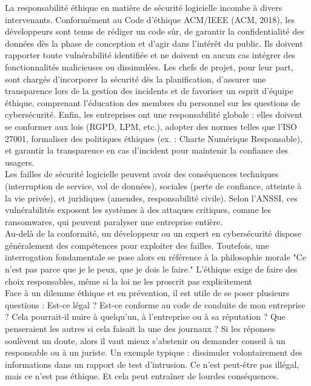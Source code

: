 \documentclass{article}
\begin{document}
La responsabilité éthique en matière de sécurité logicielle incombe à divers intervenants.
Conformément au Code d'éthique ACM/IEEE (ACM, 2018), les développeurs sont tenus de
rédiger un code sûr, de garantir la confidentialité des données dès la phase de conception et
d'agir dans l'intérêt du public. Ils doivent rapporter toute vulnérabilité identifiée et ne doivent
en aucun cas intégrer des fonctionnalités malicieuses ou dissimulées. Les chefs de projet, pour
leur part, sont chargés d’incorporer la sécurité dès la planification, d’assurer une transparence
lors de la gestion des incidents et de favoriser un esprit d'équipe éthique, comprenant
l'éducation des membres du personnel sur les questions de cybersécurité. Enfin, les entreprises
ont une responsabilité globale : elles doivent se conformer aux lois (RGPD, LPM, etc.), adopter
des normes telles que l’ISO 27001, formaliser des politiques éthiques (ex. : Charte Numérique
Responsable), et garantir la transparence en cas d’incident pour maintenir la confiance des
usagers.\\

Les failles de sécurité logicielle peuvent avoir des conséquences techniques (interruption
de service, vol de données), sociales (perte de confiance, atteinte à la vie privée), et juridiques
(amendes, responsabilité civile). Selon l’ANSSI, ces vulnérabilités exposent les systèmes à des
attaques critiques, comme les ransomwares, qui peuvent paralyser une entreprise entière.\\

Au-delà de la conformité, un développeur ou un expert en cybersécurité dispose
généralement des compétences pour exploiter des failles. Toutefois, une interrogation
fondamentale se pose alors en référence à la philosophie morale
"Ce n’est pas parce que je le
peux, que je dois le faire." L’éthique exige de faire des choix responsables, même si la loi ne les
proscrit pas explicitement\\

Face à un dilemme éthique et en prévention, il est utile de se poser plusieurs questions : Est-ce
légal ? Est-ce conforme au code de conduite de mon entreprise ? Cela pourrait-il nuire à
quelqu’un, à l’entreprise ou à sa réputation ? Que penseraient les autres si cela faisait la une
des journaux ?
Si les réponses soulèvent un doute, alors il vaut mieux s’abstenir ou demander conseil à un
responsable ou à un juriste. Un exemple typique : dissimuler volontairement des informations
dans un rapport de test d’intrusion. Ce n’est peut-être pas illégal, mais ce n’est pas éthique. Et
cela peut entraîner de lourdes conséquences.\\
\end{document}
